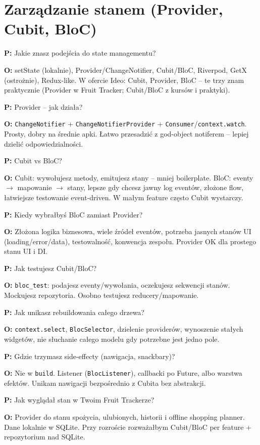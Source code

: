 \documentclass[11pt,a4paper]{article}
\newcommand{\pyt}[1]{\par\medskip\noindent\textbf{P:} #1\par}
\newcommand{\odp}[1]{\noindent\textbf{O:} #1\par}
\begin{document}
\section{Zarządzanie stanem (Provider, Cubit, BloC)}

\pyt{Jakie znasz podejścia do state managementu?}
\odp{setState (lokalnie), Provider/ChangeNotifier, Cubit/BloC, Riverpod, GetX (ostrożnie), Redux-like. W ofercie Ideo: Cubit, Provider, BloC -- te trzy znam praktycznie (Provider w Fruit Tracker; Cubit/BloC z kursów i praktyki).}

\pyt{Provider -- jak działa?}
\odp{\texttt{ChangeNotifier} + \texttt{ChangeNotifierProvider} + \texttt{Consumer}/\texttt{context.watch}. Prosty, dobry na średnie apki. Łatwo przesadzić z god-object notiferem -- lepiej dzielić odpowiedzialności.}

\pyt{Cubit vs BloC?}
\odp{Cubit: wywołujesz metody, emitujesz stany -- mniej boilerplate. BloC: eventy $\to$ mapowanie $\to$ stany, lepsze gdy chcesz jawny log eventów, złożone flow, łatwiejsze testowanie event-driven. W małym feature często Cubit wystarczy.}

\pyt{Kiedy wybrałbyś BloC zamiast Provider?}
\odp{Złożona logika biznesowa, wiele źródeł eventów, potrzeba jasnych stanów UI (loading/error/data), testowalność, konwencja zespołu. Provider OK dla prostego stanu UI i DI.}

\pyt{Jak testujesz Cubit/BloC?}
\odp{\texttt{bloc\_test}: podajesz eventy/wywołania, oczekujesz sekwencji stanów. Mockujesz repozytoria. Osobno testujesz reducery/mapowanie.}

\pyt{Jak unikasz rebuildowania całego drzewa?}
\odp{\texttt{context.select}, \texttt{BlocSelector}, dzielenie providerów, wynoszenie stałych widgetów, nie słuchanie całego modelu gdy potrzebne jest jedno pole.}

\pyt{Gdzie trzymasz side-effecty (nawigacja, snackbary)?}
\odp{Nie w \texttt{build}. Listener (\texttt{BlocListener}), callbacki po Future, albo warstwa efektów. Unikam nawigacji bezpośrednio z Cubita bez abstrakcji.}

\pyt{Jak wyglądał stan w Twoim Fruit Trackerze?}
\odp{Provider do stanu spożycia, ulubionych, historii i offline shopping planner. Dane lokalnie w SQLite. Przy rozroście rozważałbym Cubit/BloC per feature + repozytorium nad SQLite.}

\end{document}
